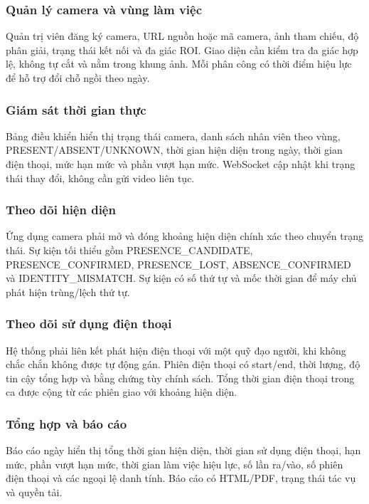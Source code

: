 \subsubsection{Quản lý camera và vùng làm việc}
Quản trị viên đăng ký camera, URL nguồn hoặc mã camera, ảnh tham chiếu, độ phân giải, trạng thái kết nối và đa giác ROI. Giao diện cần kiểm tra đa giác hợp lệ, không tự cắt và nằm trong khung ảnh. Mỗi phân công có thời điểm hiệu lực để hỗ trợ đổi chỗ ngồi theo ngày.

\subsubsection{Giám sát thời gian thực}
Bảng điều khiển hiển thị trạng thái camera, danh sách nhân viên theo vùng, PRESENT/ABSENT/UNKNOWN, thời gian hiện diện trong ngày, thời gian điện thoại, mức hạn mức và phần vượt hạn mức. WebSocket cập nhật khi trạng thái thay đổi, không cần gửi video liên tục.

\subsubsection{Theo dõi hiện diện}
Ứng dụng camera phải mở và đóng khoảng hiện diện chính xác theo chuyển trạng thái. Sự kiện tối thiểu gồm PRESENCE\_CANDIDATE, PRESENCE\_CONFIRMED, PRESENCE\_LOST, ABSENCE\_CONFIRMED và IDENTITY\_MISMATCH. Sự kiện có số thứ tự và mốc thời gian để máy chủ phát hiện trùng/lệch thứ tự.

\subsubsection{Theo dõi sử dụng điện thoại}
Hệ thống phải liên kết phát hiện điện thoại với một quỹ đạo người, khi không chắc chắn không được tự động gán. Phiên điện thoại có start/end, thời lượng, độ tin cậy tổng hợp và bằng chứng tùy chính sách. Tổng thời gian điện thoại trong ca được cộng từ các phiên giao với khoảng hiện diện.

\subsubsection{Tổng hợp và báo cáo}
Báo cáo ngày hiển thị tổng thời gian hiện diện, thời gian sử dụng điện thoại, hạn mức, phần vượt hạn mức, thời gian làm việc hiệu lực, số lần ra/vào, số phiên điện thoại và các ngoại lệ danh tính. Báo cáo có HTML/PDF, trạng thái tác vụ và quyền tải.


